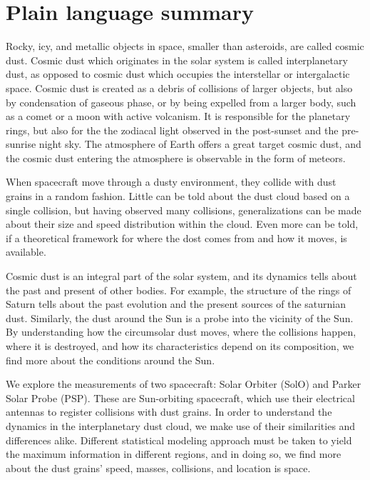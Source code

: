 \section{Plain language summary}

Rocky, icy, and metallic objects in space, smaller than asteroids, are called cosmic dust. Cosmic dust which originates in the solar system is called interplanetary dust, as opposed to cosmic dust which occupies the interstellar or intergalactic space. Cosmic dust is created as a debris of collisions of larger objects, but also by condensation of gaseous phase, or by being expelled from a larger body, such as a comet or a moon with active volcanism. It is responsible for the planetary rings, but also for the the zodiacal light observed in the post-sunset and the pre-sunrise night sky. The atmosphere of Earth offers a great target cosmic dust, and the cosmic dust entering the atmosphere is observable in the form of meteors. 

When spacecraft move through a dusty environment, they collide with dust grains in a random fashion. Little can be told about the dust cloud based on a single collision, but having observed many collisions, generalizations can be made about their size and speed distribution within the cloud. Even more can be told, if a theoretical framework for where the dost comes from and how it moves, is available. 

Cosmic dust is an integral part of the solar system, and its dynamics tells about the past and present of other bodies. For example, the structure of the rings of Saturn tells about the past evolution and the present sources of the saturnian dust. Similarly, the dust around the Sun is a probe into the vicinity of the Sun. By understanding how the circumsolar dust moves, where the collisions happen, where it is destroyed, and how its characteristics depend on its composition, we find more about the conditions around the Sun. 

We explore the measurements of two spacecraft: Solar Orbiter (SolO) and Parker Solar Probe (PSP). These are Sun-orbiting spacecraft, which use their electrical antennas to register collisions with dust grains. In order to understand the dynamics in the interplanetary dust cloud, we make use of their similarities and differences alike. Different statistical modeling approach must be taken to yield the maximum information in different regions, and in doing so, we find more about the dust grains' speed, masses, collisions, and location is space.


